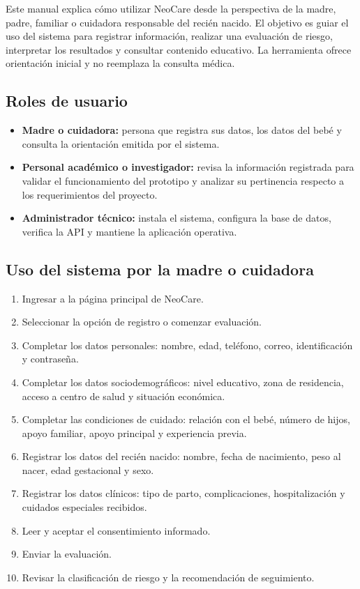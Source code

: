 \documentclass[12pt,letterpaper]{article}
\begin{document}
Este manual explica cómo utilizar NeoCare desde la perspectiva de la madre, padre, familiar o cuidadora responsable del recién nacido. El objetivo es guiar el uso del sistema para registrar información, realizar una evaluación de riesgo, interpretar los resultados y consultar contenido educativo. La herramienta ofrece orientación inicial y no reemplaza la consulta médica.

\subsection{Roles de usuario}

\begin{itemize}
    \item \textbf{Madre o cuidadora:} persona que registra sus datos, los datos del bebé y consulta la orientación emitida por el sistema.
    \item \textbf{Personal académico o investigador:} revisa la información registrada para validar el funcionamiento del prototipo y analizar su pertinencia respecto a los requerimientos del proyecto.
    \item \textbf{Administrador técnico:} instala el sistema, configura la base de datos, verifica la API y mantiene la aplicación operativa.
\end{itemize}

\subsection{Uso del sistema por la madre o cuidadora}

\begin{enumerate}
    \item Ingresar a la página principal de NeoCare.
    \item Seleccionar la opción de registro o comenzar evaluación.
    \item Completar los datos personales: nombre, edad, teléfono, correo, identificación y contraseña.
    \item Completar los datos sociodemográficos: nivel educativo, zona de residencia, acceso a centro de salud y situación económica.
    \item Completar las condiciones de cuidado: relación con el bebé, número de hijos, apoyo familiar, apoyo principal y experiencia previa.
    \item Registrar los datos del recién nacido: nombre, fecha de nacimiento, peso al nacer, edad gestacional y sexo.
    \item Registrar los datos clínicos: tipo de parto, complicaciones, hospitalización y cuidados especiales recibidos.
    \item Leer y aceptar el consentimiento informado.
    \item Enviar la evaluación.
    \item Revisar la clasificación de riesgo y la recomendación de seguimiento.
\end{enumerate}
\end{document}
